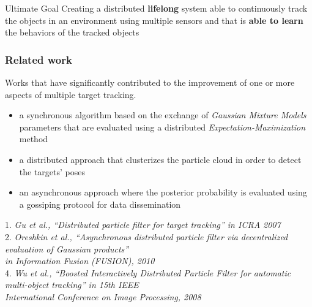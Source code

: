 \begin{frame}
	\begin{block}{Ultimate Goal}
		Creating a distributed \textbf{lifelong} system able to continuously track the objects in an environment
		using multiple sensors and that is \textbf{able to learn} the behaviors of the tracked objects
	\end{block}
\end{frame}

\begin{frame}
	\frametitle{Related work}
	
	\vspace{0.5cm}
	
	Works that have significantly contributed to the improvement of one or more aspects of multiple target tracking.
	
	\begin{itemize}
		\item a synchronous algorithm based on the exchange of \emph{Gaussian Mixture Models} parameters that are
			  evaluated using a distributed \emph{Expectation-Maximization} method \cite{Gu07}
		\item a distributed approach that clusterizes the particle cloud in order to detect the targets'
			  poses \cite{Wu08}
		\item an asynchronous approach where the posterior probability is evaluated using a gossiping protocol for
			  data dissemination \cite{Oreshkin10}
	\end{itemize}
	
	\vspace{0.5cm}
	
	\tiny 1. \emph{Gu et al., ``Distributed particle filter for target tracking'' in ICRA 2007} \\
	\vspace{0.1cm}
	\tiny 2. \emph{Oreshkin et al., ``Asynchronous distributed particle filter via decentralized evaluation of Gaussian products''} \\
	\vspace{0.05cm}
	\tiny \emph{in Information Fusion (FUSION), 2010}\\
	\vspace{0.1cm}
	\tiny 4. \emph{Wu et al., ``Boosted Interactively Distributed Particle Filter for automatic multi-object tracking'' in 15th IEEE} \\
	\vspace{-0.18cm}
	\tiny \emph{International Conference on Image Processing, 2008}
\end{frame}
